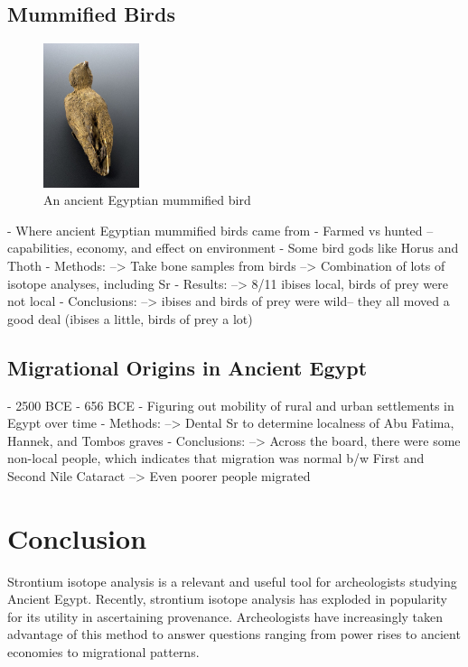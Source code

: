 \documentclass[a4paper, 12pt]{article}
\begin{document}
\subsection{Mummified Birds}
\begin{figure}[htbp]
    \centering
    \includegraphics[width=0.25\textwidth]{mummy_bird.jpg}
    \caption{An ancient Egyptian mummified bird \citep{wikipediaBird}}
    \label{fig:mummy_bird}
\end{figure}
- Where ancient Egyptian mummified birds came from
- Farmed vs hunted -- capabilities, economy, and effect on environment
- Some bird gods like Horus and Thoth
- Methods:
--> Take bone samples from birds
--> Combination of lots of isotope analyses, including Sr
- Results:
--> 8/11 ibises local, birds of prey were not local
- Conclusions:
--> ibises and birds of prey were wild-- they all moved a good deal (ibises a little, birds of prey a lot)

\subsection{Migrational Origins in Ancient Egypt}
- 2500 BCE - 656 BCE
- Figuring out mobility of rural and urban settlements in Egypt over time
- Methods:
--> Dental Sr to determine localness of Abu Fatima, Hannek, and Tombos graves
- Conclusions:
--> Across the board, there were some non-local people, which indicates that migration was normal b/w First and Second Nile Cataract
--> Even poorer people migrated

\section{Conclusion}
Strontium isotope analysis is a relevant and useful tool for archeologists studying
Ancient Egypt. Recently, strontium isotope analysis has exploded in popularity for
its utility in ascertaining provenance. Archeologists have increasingly taken
advantage of this method to answer questions
ranging from power rises to ancient economies to migrational patterns.

\end{document}
